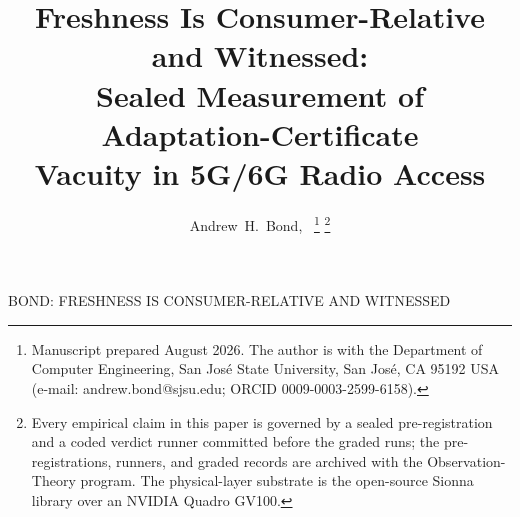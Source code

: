 \documentclass[lettersize,onecolumn]{IEEEtran}
\theoremstyle{remark}
\begin{document}
\title{Freshness Is Consumer-Relative and Witnessed:\\ Sealed Measurement of Adaptation-Certificate\\ Vacuity in 5G/6G Radio Access}

\author{Andrew~H.~Bond,~%
\thanks{Manuscript prepared August 2026. The author is with the Department of
Computer Engineering, San Jos\'e State University, San Jos\'e, CA 95192 USA
(e-mail: andrew.bond@sjsu.edu; ORCID 0009-0003-2599-6158).}%
\thanks{Every empirical claim in this paper is governed by a sealed
pre-registration and a coded verdict runner committed before the graded runs;
the pre-registrations, runners, and graded records are archived with the
Observation-Theory program. The physical-layer substrate is the open-source
Sionna library over an NVIDIA Quadro GV100.}}

%
{BOND: FRESHNESS IS CONSUMER-RELATIVE AND WITNESSED}
\maketitle
\end{document}
